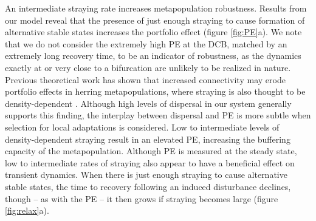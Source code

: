 \documentclass{revtex4}
\begin{document}
% 

An intermediate straying rate increases metapopulation robustness. 
Results from our model reveal that the presence of just enough straying to cause formation of alternative stable states increases the portfolio effect (figure \ref{fig:PE}a). 
We note that we do not consider the extremely high PE at the DCB, matched by an extremely long recovery time, to be an indicator of robustness, as the dynamics exactly at or very close to a bifurcation are unlikely to be realized in nature.
Previous theoretical work has shown that increased connectivity may erode portfolio effects in herring metapopulations, where straying is also thought to be density-dependent \citep{Secor:2009ena}.
Although high levels of dispersal in our system generally supports this finding, the interplay between dispersal and PE is more subtle when selection for local adaptations is considered.
Low to intermediate levels of density-dependent straying result in an elevated PE, increasing the buffering capacity of the metapopulation.
Although PE is measured at the steady state, low to intermediate rates of straying also appear to have a beneficial effect on transient dynamics.
When there is just enough straying to cause alternative stable states, the time to recovery following an induced disturbance declines, though -- as with the PE -- it then grows if straying becomes large (figure \ref{fig:relax}a).


\end{document}
